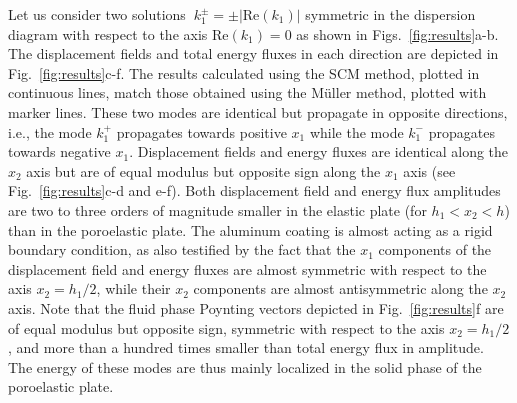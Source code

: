 Let us consider two solutions $\ k_{1}^\pm=\pm |\textrm{Re}\left(k_{1}\right)|$ symmetric in the dispersion diagram with respect to the axis $\textrm{Re}\left(k_1 \right)=0$ as shown in Figs.~\ref{fig:results}a-b. The displacement fields and total energy fluxes in each direction are depicted in Fig.~\ref{fig:results}c-f. The results calculated using the SCM method, plotted in continuous lines, match those obtained using the Müller method, plotted with marker lines. These two modes are identical but propagate in opposite directions, i.e., the mode $ k_{1}^+$ propagates towards positive $x_1$ while the mode $ k_{1}^-$ propagates towards negative $x_1$. Displacement fields and energy fluxes are identical along the $x_2$ axis but are of equal modulus but opposite sign along the $x_1$ axis (see Fig.~\ref{fig:results}c-d and e-f). Both displacement field and energy flux amplitudes are two to three orders of magnitude smaller in the elastic plate (for $h_1<x_2<h$) than in the poroelastic plate. The aluminum coating is almost acting as a rigid boundary condition, as also testified by the fact that the $x_1$ components of the displacement field and energy fluxes are almost symmetric with respect to the axis $x_2=h_1/2$, while their $x_2$ components are almost antisymmetric along the $x_2$ axis. Note that the fluid phase Poynting vectors depicted in Fig.~\ref{fig:results}f are of equal modulus but opposite sign, symmetric with respect to the axis $x_2=h_1/2$, and more than a hundred times smaller than total energy flux in amplitude. The energy of these modes are thus mainly localized in the solid phase of the poroelastic plate. 
 
